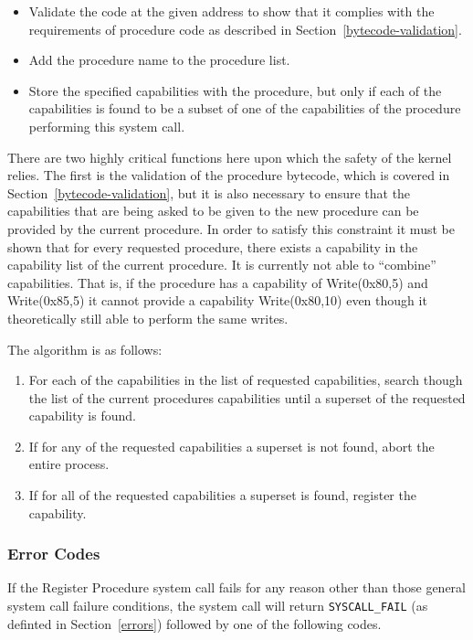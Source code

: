 \documentclass[english,a4paper]{article}
\let\oldparagraph\subsubsection
\renewcommand{\subsubsection}[1]{\oldparagraph{#1}\mbox{}}
\begin{document}
\begin{itemize}
  \item Validate the code at the given address to show that it complies with the
  requirements of procedure code as described in
  Section~\ref{bytecode-validation}.
  \item Add the procedure name to the procedure list.
  \item Store the specified capabilities with the procedure, but only if each of
  the capabilities is found to be a subset of one of the capabilities of the
  procedure performing this system call.
\end{itemize}

There are two highly critical functions here upon which the safety of the kernel
relies. The first is the validation of the procedure bytecode, which is covered
in Section~\ref{bytecode-validation}, but it is also necessary to ensure that
the capabilities that are being asked to be given to the new procedure can be
provided by the current procedure. In order to satisfy this constraint it must
be shown that for every requested procedure, there exists a capability in the
capability list of the current procedure. It is currently not able to
``combine'' capabilities. That is, if the procedure has a capability of
Write(0x80,5) and Write(0x85,5) it cannot provide a capability Write(0x80,10)
even though it theoretically still able to perform the same writes.

The algorithm is as follows:

\begin{enumerate}
  \item For each of the capabilities in the list of requested capabilities,
  search though the list of the current procedures capabilities until a superset
  of the requested capability is found.
  \item If for any of the requested capabilities a superset is not found, abort
  the entire process.
  \item If for all of the requested capabilities a superset is found, register
  the capability.
\end{enumerate}

\subsubsection{Error Codes}
If the Register Procedure system call fails for any reason other than those
general system call failure conditions, the system call will return
\texttt{SYSCALL\_FAIL} (as definted in Section~\ref{errors}) followed by one of
the following codes.
\end{document}
